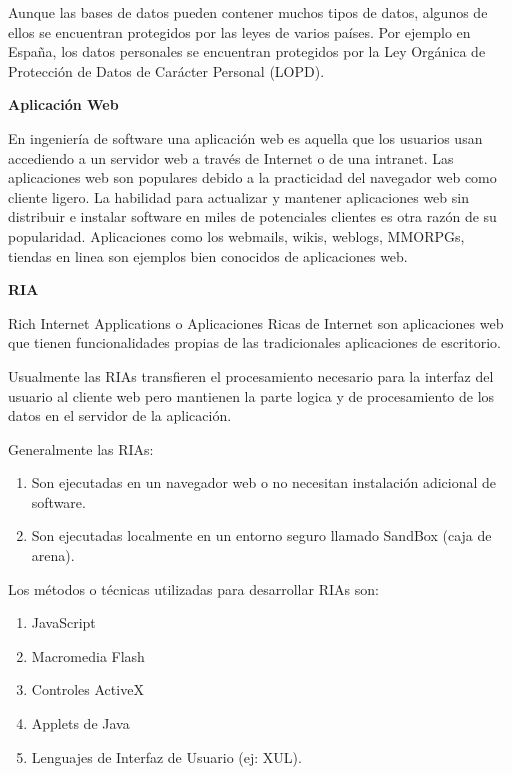 \documentclass[12pt,letterpaper,oneside]{article}
\begin{document}
\bigskip

Aunque las bases de datos pueden contener muchos tipos de datos, algunos
de ellos se encuentran protegidos por las leyes de varios países. Por
ejemplo en España, los datos personales se encuentran protegidos por
la Ley Orgánica de Protección de Datos de Carácter Personal
(LOPD).


\bigskip

{\bfseries
Aplicación Web}

\textmd{E}n ingeniería de software una aplicación web es aquella que
los usuarios usan accediendo a un servidor web a través de Internet o
de una intranet. Las aplicaciones web son populares debido a la
practicidad del navegador web como cliente ligero. La habilidad para
actualizar y mantener aplicaciones web sin distribuir e instalar
software en miles de potenciales clientes es otra razón de su
popularidad. Aplicaciones como los webmails, wikis, weblogs, MMORPGs,
tiendas en linea son ejemplos bien conocidos de aplicaciones web.

{\bfseries
RIA}

Rich Internet Applications o Aplicaciones Ricas de Internet son
aplicaciones web que tienen funcionalidades propias de las
tradicionales aplicaciones de escritorio.

Usualmente las RIAs transfieren el procesamiento necesario para la
interfaz del usuario al cliente web pero mantienen la parte logica y de
procesamiento de los datos en el servidor de la aplicación.

Generalmente las RIAs:


\bigskip


\begin{enumerate}
\item Son ejecutadas en un navegador web o no necesitan instalación
adicional de software.
\item Son ejecutadas localmente en un entorno seguro llamado SandBox
(caja de arena).
\end{enumerate}

\bigskip

Los métodos o técnicas utilizadas para desarrollar RIAs son:


\begin{enumerate}
\item JavaScript
\item Macromedia Flash
\item Controles ActiveX
\item Applets de Java
\item Lenguajes de Interfaz de Usuario (ej: XUL).
\end{enumerate}
\end{document}
